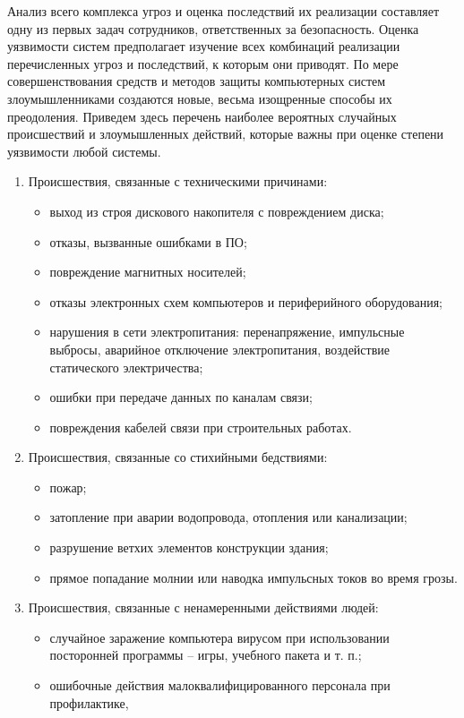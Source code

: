 Анализ всего комплекса угроз и оценка последствий их реализации составляет одну
из первых задач сотрудников, ответственных за безопасность. Оценка уязвимости
систем предполагает изучение всех комбинаций реализации перечисленных угроз и
последствий, к которым они приводят. По мере совершенствования средств и методов
защиты компьютерных систем злоумышленниками создаются новые, весьма изощренные
способы их преодоления. Приведем здесь перечень наиболее вероятных случайных
происшествий и злоумышленных действий, которые важны при оценке степени
уязвимости любой системы.
\begin{enumerate}
  \item Происшествия, связанные с техническими причинами:
  \begin{itemize}
    \item выход из строя дискового накопителя с повреждением диска;
	\item отказы, вызванные ошибками в ПО;
	\item повреждение магнитных носителей;
	\item отказы электронных схем компьютеров и периферийного оборудования;
	\item нарушения в сети электропитания: перенапряжение, импульсные выбросы,
аварийное отключение электропитания, воздействие статического электричества;
	\item ошибки при передаче данных по каналам связи;
	\item повреждения кабелей связи при строительных работах. 
  \end{itemize}
  \item Происшествия, связанные со стихийными бедствиями:
  \begin{itemize}
    \item пожар;
	\item затопление при аварии водопровода, отопления или канализации;
	\item разрушение ветхих элементов конструкции здания;
	\item прямое попадание молнии или наводка импульсных токов во время грозы.
  \end{itemize}
  \item Происшествия, связанные с ненамеренными действиями людей:
  \begin{itemize}
    \item случайное заражение компьютера вирусом при использовании посторонней
    программы -- игры, учебного пакета и т. п.;
	\item ошибочные действия малоквалифицированного персонала при профилактике,

\end{itemize}
\end{enumerate}
